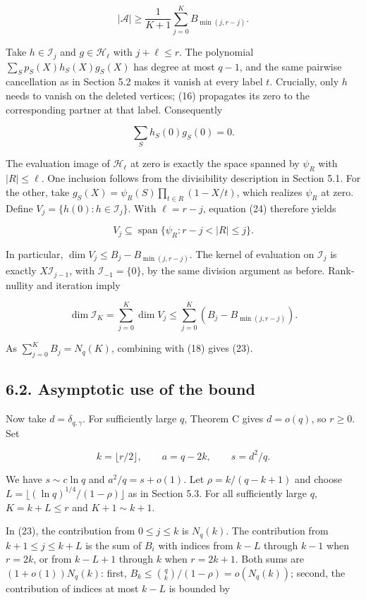 \documentclass[
  10pt,
]{article}
\begin{document}
\[
 \boxed{
 |\mathcal A|\ge\frac1{K+1}\sum_{j=0}^K B_{\min(j,r-j)}.
 }\tag{23}
\]

Take \(h\in\mathcal I_j\) and \(g\in\mathcal H_\ell\) with \(j+\ell\le r\). The polynomial \(\sum_Sp_S(X)h_S(X)g_S(X)\) has degree at most \(q-1\), and the same pairwise cancellation as in Section 5.2 makes it vanish at every label \(t\). Crucially, only \(h\) needs to vanish on the deleted vertices; (16) propagates its zero to the corresponding partner at that label. Consequently

\[
 \sum_Sh_S(0)g_S(0)=0.\tag{24}
\]

The evaluation image of \(\mathcal H_\ell\) at zero is exactly the space spanned by \(\psi_R\) with \(|R|\le\ell\). One inclusion follows from the divisibility description in Section 5.1. For the other, take \(g_S(X)=\psi_R(S)\prod_{t\in R}(1-X/t)\), which realizes \(\psi_R\) at zero. Define \(V_j=\{h(0):h\in\mathcal I_j\}\). With \(\ell=r-j\), equation (24) therefore yields

\[
 V_j\subseteq\operatorname{span}\{\psi_R:r-j<|R|\le j\}.
\]

In particular, \(\dim V_j\le B_j-B_{\min(j,r-j)}\). The kernel of evaluation on \(\mathcal I_j\) is exactly \(X\mathcal I_{j-1}\), with \(\mathcal I_{-1}=\{0\}\), by the same division argument as before. Rank-nullity and iteration imply

\[
 \dim\mathcal I_K=\sum_{j=0}^K\dim V_j
 \le\sum_{j=0}^K(B_j-B_{\min(j,r-j)}).
\]

As \(\sum_{j=0}^K B_j=N_q(K)\), combining with (18) gives (23).

\subsection{6.2. Asymptotic use of the bound}\label{asymptotic-use-of-the-bound}

Now take \(d=\delta_{q,\gamma}\). For sufficiently large \(q\), Theorem C gives \(d=o(q)\), so \(r\ge0\). Set

\[
 k=\lfloor r/2\rfloor,\qquad a=q-2k,\qquad s=d^2/q.
\]

We have \(s\sim c\ln q\) and \(a^2/q=s+o(1)\). Let \(\rho=k/(q-k+1)\) and choose \(L=\lfloor(\ln q)^{1/4}/(1-\rho)\rfloor\) as in Section 5.3. For all sufficiently large \(q\), \(K=k+L\le r\) and \(K+1\sim k+1\).

In (23), the contribution from \(0\le j\le k\) is \(N_q(k)\). The contribution from \(k+1\le j\le k+L\) is the sum of \(B_i\) with indices from \(k-L\) through \(k-1\) when \(r=2k\), or from \(k-L+1\) through \(k\) when \(r=2k+1\). Both sums are \((1+o(1))N_q(k)\): first, \(B_k\le\binom qk/(1-\rho)=o(N_q(k))\); second, the contribution of indices at most \(k-L\) is bounded by
\end{document}
